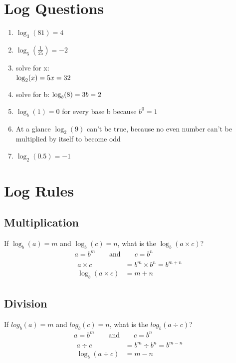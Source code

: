 \documentclass{article}
\begin{document}
\section{Log Questions}
\begin{enumerate}[label=\textbf{\arabic*.}, itemsep=1.2em]
  \item $\log_{3}(81) = 4$
  \item $\log_{5}(\frac{1}{25}) = -2$ 
  \item solve for x: \\ $\log_{2}(x) = 5 \\ x = 32$
  \item solve for b: $\log_{b}(8) = 3 \\ b = 2$
  \item $\log_{b}(1) = 0$ for every base b because $b^0 = 1$ 
  \item At a glance $\log_{2}(9)$ can't be true, because no even number can't be multiplied by itself to become odd
  \item $\log_{2}(0.5) = -1$ 
\end{enumerate}

\section{Log Rules}
\subsection{Multiplication}
If $\log_{b}(a) = m$ and $\log_{b}(c) = n$, what is the $\log_{b}(a \times c)$?
\begin{gather*}
  a = b^m \qquad \text{and} \qquad c = b^n \\
  \begin{aligned}
    a \times c &= b^m \times b^n = b^{m+n} \\
    \log_{b}(a \times c) &= m + n
  \end{aligned}
\end{gather*}

\subsection{Division}
If $log_{b}(a) = m$ and $log_{b}(c) = n$, what is the $log_{b}(a \div c)$?
\begin{gather*}
  a = b^m \qquad\text{and}\qquad c = b^n \\
  \begin{aligned}
    a \div c &= b^m \div b^n = b^{m - n} \\
    \log_{b}(a \div c) &= m - n
  \end{aligned}
\end{gather*}
\end{document}
